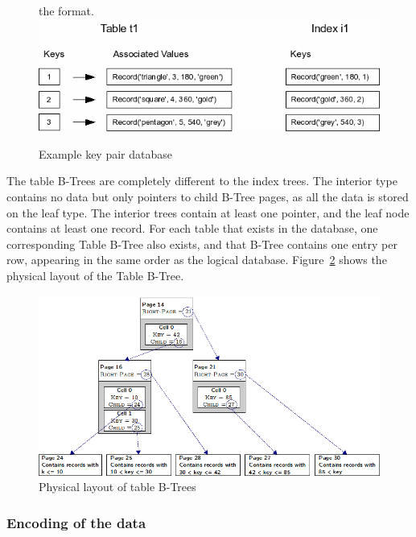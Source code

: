 \begin{figure}[H]the format.
	\centering
	\includegraphics[scale=0.5]{images/examplepop.png}
	\caption{Example key pair database \citep{sqliteray}}
	\label{fig:sqlite_key_pair}
\end{figure}

The table B-Trees are completely different to the index trees. The interior type contains no data but only pointers to child B-Tree pages, as all the data is stored on the leaf type. The interior trees contain at least one pointer, and the leaf node contains at least one record. For each table that exists in the database, one corresponding Table B-Tree also exists, and that B-Tree contains one entry per row, appearing in the same order as the logical database. Figure~\ref{fig:sqlite_table_btree} shows the physical layout of the Table B-Tree. 

\begin{figure}[H]
	\centering
	\includegraphics[scale=0.5]{images/sqlite_table_btree.png}
	\caption{Physical layout of table B-Trees \citep{chibd}}
	\label{fig:sqlite_table_btree}
\end{figure}

\subsubsection{Encoding of the data}
\label{subsubsec:sqlite_data_encoding}

